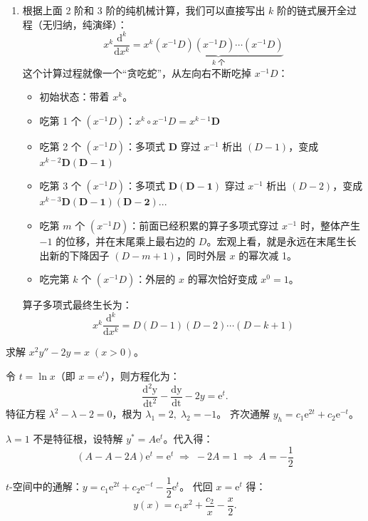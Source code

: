 \documentclass[lang=cn,11pt]{elegantbook}
\begin{document}
\begin{remark}[变换的本质]
\begin{enumerate}
\begin{align*}
x^3 \frac{\mathrm{d}^3}{\mathrm{d}x^3}
&= x^3 \left(x^{-1}D\right)\left(x^{-1}D\right)\left(x^{-1}D\right) =x^2 \mathbf{D \left(x^{-1}\right.}D\left)\left(x^{-1}D\right)\right. \\
&= x^2 \mathbf{x^{-1}(D-1)} D \left(x^{-1}D\right)= x \mathbf{D(D-1)} \left(\mathbf{x^{-1}}D\right)\\
&= x \left[ \mathbf{x^{-1}(D-1)(D-2)} \right] D=D(D-1)(D-2)
\end{align*}
\item 根据上面 2 阶和 3 阶的纯机械计算，我们可以直接写出 $k$ 阶的链式展开全过程（无归纳，纯演绎）：
\[
x^k \frac{\mathrm{d}^k}{\mathrm{d}x^k} = x^k \underbrace{(x^{-1}D)(x^{-1}D)\cdots(x^{-1}D)}_{k \text{ 个}}
\]
这个计算过程就像一个“贪吃蛇”，从左向右不断吃掉 $x^{-1}D$：
\begin{itemize}
\item 初始状态：带着 $x^k$。
\item 吃第 1 个 $(x^{-1}D)$：$x^k \circ x^{-1}D = x^{k-1}\mathbf{D}$
\item 吃第 2 个 $(x^{-1}D)$：多项式 $\mathbf{D}$ 穿过 $x^{-1}$ 析出 $(D-1)$，变成 $x^{k-2}\mathbf{D(D-1)}$
\item 吃第 3 个 $(x^{-1}D)$：多项式 $\mathbf{D(D-1)}$ 穿过 $x^{-1}$ 析出 $(D-2)$，变成 $x^{k-3}\mathbf{D(D-1)(D-2)}$...
\item 吃第 $m$ 个 $(x^{-1}D)$：前面已经积累的算子多项式穿过 $x^{-1}$ 时，整体产生 $-1$ 的位移，并在末尾乘上最右边的 $D$。宏观上看，就是永远在末尾生长出新的下降因子 $(D-m+1)$，同时外层 $x$ 的幂次减 1。
\item 吃完第 $k$ 个 $(x^{-1}D)$：外层的 $x$ 的幂次恰好变成 $x^0 = 1$。
\end{itemize}
算子多项式最终生长为：
\[
\boxed{x^k \frac{\mathrm{d}^k}{\mathrm{d}x^k} = D(D-1)(D-2)\cdots(D-k+1)}
\]
\end{enumerate}
\end{remark}

\begin{exercise}
求解 $x^2y''-2y=x\;(x>0)$。
\end{exercise}
\begin{solution}
令 $t=\ln x$（即 $x=\mathrm{e}^t$），则方程化为：
\[
\frac{\mathrm{d^2y}}{\mathrm{dt^2}}-\frac{\mathrm{\mathrm{d}y}}{\mathrm{\mathrm{d}t}}-2y=\mathrm{e}^t.
\]
特征方程 $\lambda^2-\lambda-2=0$，根为 $\lambda_1=2,\;\lambda_2=-1$。
齐次通解 $y_h=c_1\mathrm{e}^{2t}+c_2\mathrm{e}^{-t}$。

$\lambda=1$ 不是特征根，设特解 $y^*=A\mathrm{e}^t$。代入得：
\[
(A-A-2A)\mathrm{e}^t=\mathrm{e}^t\;\Rightarrow\;-2A=1\;\Rightarrow\;A=-\dfrac12
\]

$t$-空间中的通解：$y=c_1\mathrm{e}^{2t}+c_2\mathrm{e}^{-t}-\dfrac12\mathrm{e}^t$。
代回 $x=\mathrm{e}^t$ 得：
\[
\boxed{y(x)=c_1x^2+\frac{c_2}{x}-\frac{x}{2}}.
\]
\end{solution}
\end{document}
